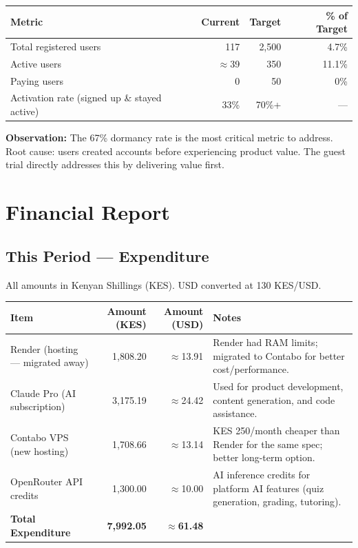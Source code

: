 \documentclass[12pt,a4paper]{article}
\begin{document}
\begin{tabularx}{\linewidth}{X r r r}
\toprule
\textbf{Metric} & \textbf{Current} & \textbf{Target} & \textbf{\% of Target} \\
\midrule
\rowcolor{rowgray}
Total registered users & 117 & 2,500 & 4.7\% \\
Active users & $\approx$39 & 350 & 11.1\% \\
\rowcolor{rowgray}
Paying users & 0 & 50 & 0\% \\
Activation rate (signed up \& stayed active) & 33\% & 70\%+ & — \\
\bottomrule
\end{tabularx}

\vspace{6pt}
\textbf{Observation:} The 67\% dormancy rate is the most critical metric to address.
Root cause: users created accounts before experiencing product value.
The guest trial directly addresses this by delivering value first.

\section{Financial Report}

\subsection{This Period — Expenditure}

All amounts in Kenyan Shillings (KES). USD converted at 130 KES/USD.

\begin{tabularx}{\linewidth}{X r r l}
\toprule
\textbf{Item} & \textbf{Amount (KES)} & \textbf{Amount (USD)} & \textbf{Notes} \\
\midrule
\rowcolor{rowgray}
Render (hosting — migrated away) & 1,808.20 & $\approx$13.91 &
  Render had RAM limits; migrated to Contabo for better cost/performance. \\
Claude Pro (AI subscription) & 3,175.19 & $\approx$24.42 &
  Used for product development, content generation, and code assistance. \\
\rowcolor{rowgray}
Contabo VPS (new hosting) & 1,708.66 & $\approx$13.14 &
  KES 250/month cheaper than Render for the same spec; better long-term option. \\
OpenRouter API credits & 1,300.00 & $\approx$10.00 &
  AI inference credits for platform AI features (quiz generation, grading, tutoring). \\
\midrule
\textbf{Total Expenditure} & \textbf{7,992.05} & \textbf{$\approx$61.48} & \\
\bottomrule
\end{tabularx}
\end{document}

